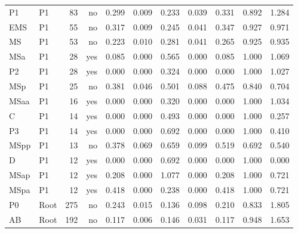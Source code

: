 \documentclass[10pt]{article}
\begin{document}
\begin{table}[p]
{\begin{tabular}{llrrrrrrrrr}
\midrule
P1 & P1 & 83 & no & 0.299 & 0.009 & 0.233 & 0.039 & 0.331 & 0.892 & 1.284 \\
EMS & P1 & 55 & no & 0.317 & 0.009 & 0.245 & 0.041 & 0.347 & 0.927 & 0.971 \\
MS & P1 & 53 & no & 0.223 & 0.010 & 0.281 & 0.041 & 0.265 & 0.925 & 0.935 \\
MSa & P1 & 28 & yes & 0.085 & 0.000 & 0.565 & 0.000 & 0.085 & 1.000 & 1.069 \\
P2 & P1 & 28 & yes & 0.000 & 0.000 & 0.324 & 0.000 & 0.000 & 1.000 & 1.027 \\
MSp & P1 & 25 & no & 0.381 & 0.046 & 0.501 & 0.088 & 0.475 & 0.840 & 0.704 \\
MSaa & P1 & 16 & yes & 0.000 & 0.000 & 0.320 & 0.000 & 0.000 & 1.000 & 1.034 \\
C & P1 & 14 & yes & 0.000 & 0.000 & 0.493 & 0.000 & 0.000 & 1.000 & 0.257 \\
P3 & P1 & 14 & yes & 0.000 & 0.000 & 0.692 & 0.000 & 0.000 & 1.000 & 0.410 \\
MSpp & P1 & 13 & no & 0.378 & 0.069 & 0.659 & 0.099 & 0.519 & 0.692 & 0.540 \\
D & P1 & 12 & yes & 0.000 & 0.000 & 0.692 & 0.000 & 0.000 & 1.000 & 0.000 \\
MSap & P1 & 12 & yes & 0.208 & 0.000 & 1.077 & 0.000 & 0.208 & 1.000 & 0.721 \\
MSpa & P1 & 12 & yes & 0.418 & 0.000 & 0.238 & 0.000 & 0.418 & 1.000 & 0.721 \\
\midrule
P0 & Root & 275 & no & 0.243 & 0.015 & 0.136 & 0.098 & 0.210 & 0.833 & 1.805 \\
AB & Root & 192 & no & 0.117 & 0.006 & 0.146 & 0.031 & 0.117 & 0.948 & 1.653 \\
\bottomrule
\end{tabular}
}
\end{table}
\end{document}
